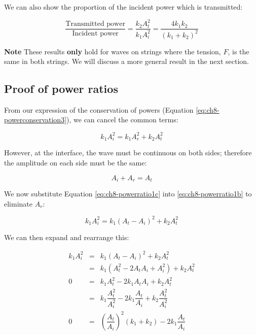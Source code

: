 \documentclass[
]{book}
\begin{document}
We can also show the proportion of the incident power which is transmitted:

\begin{equation}
\frac{\textrm{Transmitted power}}{\textrm{Incident power}} = \frac{k_2 A_t^2}{k_1 A_i^2} =  \frac{4k_1 k_2}{\left( k_1 + k_2\right)^2}
\label{eq:ch8-powerratio2}
\end{equation}

\textbf{Note} These results \textbf{only} hold for waves on strings where the tension, \(F\), is the same in both strings. We will discuss a more general result in the next section.

\hypertarget{proof-of-power-ratios}{%
\subsection*{Proof of power ratios}\label{proof-of-power-ratios}}

From our expression of the conservation of powers (Equation \eqref{eq:ch8-powerconservation3}), we can cancel the common terms:

\begin{equation}
k_1  A_i^2  =  k_1  A_r^2 +  k_2  A_t^2
\label{eq:ch8-powerratio1b}
\end{equation}

However, at the interface, the wave must be continuous on both sides; therefore the amplitude on each side must be the same:

\begin{equation}
A_i + A_r  =  A_t
\label{eq:ch8-powerratio1c}
\end{equation}

We now substitute Equation \eqref{eq:ch8-powerratio1c} into \eqref{eq:ch8-powerratio1b} to eliminate \(A_r\):

\begin{equation}
k_1  A_i^2  =  k_1  (A_t - A_i)^2 +  k_2  A_t^2
\label{eq:ch8-powerratio1d}
\end{equation}

We can then expand and rearrange this:

\begin{equation}
\begin{array}{rcl}
k_1  A_i^2  &=&  k_1  (A_t - A_i)^2 +  k_2  A_t^2\\
            &=& k_1 (A_t^2 - 2A_t A_i + A_i^2) + k_2  A_t^2 \\
    0       &=& k_1 A_t^2 - 2 k_1 A_t A_i + k_2  A_t^2 \\
            &=& k_1\dfrac{A_t^2}{A_i^2} - 2 k_1 \dfrac{A_t}{A_i} + k_2 \dfrac{A_t^2}{A_i^2} \\
    0       &=& \left(\dfrac{A_t}{A_i} \right)^2 (k_1 + k_2) - 2 k_1 \dfrac{A_t}{A_i} \\
\end{array}
\label{eq:ch8-powerratio1e}
\end{equation}
\end{document}
